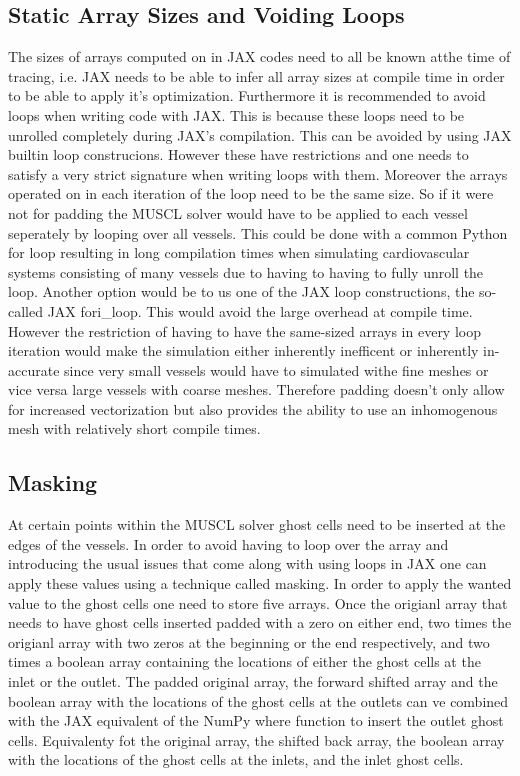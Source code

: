 \documentclass[a4paper, oneside]{discothesis}
\begin{document}
\subsection{Static Array Sizes and Voiding Loops}
The sizes of arrays computed on in JAX codes need to all be known atthe time of tracing, i.e. JAX needs to be able to infer all array sizes at compile time in order to be able to apply it's optimization.
Furthermore it is recommended to avoid loops when writing code with JAX.
This is because these loops need to be unrolled completely during JAX's compilation.
This can be avoided by using JAX builtin loop construcions.
However these have restrictions and one needs to satisfy a very strict signature when writing loops with them.
Moreover the arrays operated on in each iteration of the loop need to be the same size.
So if it were not for padding the MUSCL solver would have to be applied to each vessel seperately by looping over all vessels.
This could be done with a common Python for loop resulting in long compilation times when simulating cardiovascular systems consisting of many vessels due to having to having to fully unroll the loop.
Another option would be to us one of the JAX loop constructions, the so-called JAX fori\_loop.
This would avoid the large overhead at compile time.
However the restriction of having to have the same-sized arrays in every loop iteration would make the simulation either inherently inefficent or inherently in-accurate since very small vessels would have to simulated withe fine meshes or vice versa large vessels with coarse meshes.
Therefore padding doesn't only allow for increased vectorization but also provides the ability to use an inhomogenous mesh with relatively short compile times.

\subsection{Masking}
At certain points within the MUSCL solver ghost cells need to be inserted at the edges of the vessels.
In order to avoid having to loop over the array and introducing the usual issues that come along with using loops in JAX one can apply these values using a technique called masking.
In order to apply the wanted value to the ghost cells one need to store five arrays.
Once the origianl array that needs to have ghost cells inserted padded with a zero on either end, two times the origianl array with two zeros at the beginning or the end respectively, and two times a boolean array containing the locations of either the ghost cells at the inlet or the outlet.
The padded original array, the forward shifted array and the boolean array with the locations of the ghost cells at the outlets can ve combined with the JAX equivalent of the NumPy where function to insert the outlet ghost cells.
Equivalenty fot the original array, the shifted back array, the boolean array with the locations of the ghost cells at the inlets, and the inlet ghost cells.
\end{document}
